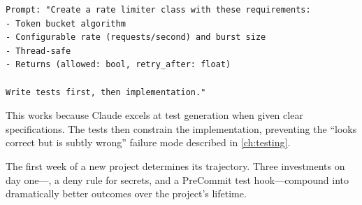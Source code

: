 \begin{verbatim}
Prompt: "Create a rate limiter class with these requirements:
- Token bucket algorithm
- Configurable rate (requests/second) and burst size
- Thread-safe
- Returns (allowed: bool, retry_after: float)

Write tests first, then implementation."
\end{verbatim}

This works because Claude excels at test generation when given
clear specifications. The tests then constrain the implementation,
preventing the ``looks correct but is subtly wrong'' failure mode
described in \cref{ch:testing}.

\begin{keyinsight}
The first week of a new project determines its trajectory.
Three investments on day one---, a deny rule for secrets,
and a PreCommit test hook---compound into dramatically better outcomes
over the project's lifetime.
\end{keyinsight}
